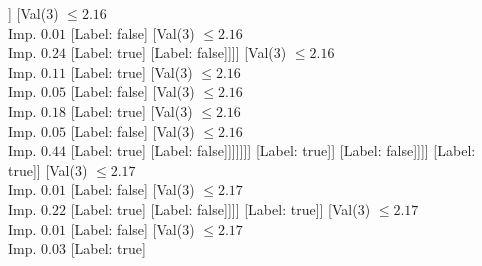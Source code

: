 \documentclass[margin=10pt]{standalone}
\begin{document}
\begin{forest}
																										[Label: true]
																										[Val($3$) $ \leq 2.16$ \\ Imp. $0.01$
																											[Val($3$) $ \leq 2.16$ \\ Imp. $0.05$
																												[Val($3$) $ \leq 2.16$ \\ Imp. $0.01$
																													[Val($3$) $ \leq 2.16$ \\ Imp. $0.02$
																														[Val($3$) $ \leq 2.16$ \\ Imp. $0.44$
																															[Label: false]
																															[Label: true]]
																														[Val($3$) $ \leq 2.16$ \\ Imp. $0.01$
																															[Label: false]
																															[Val($3$) $ \leq 2.16$ \\ Imp. $0.24$
																																[Label: true]
																																[Label: false]]]]
																													[Val($3$) $ \leq 2.16$ \\ Imp. $0.11$
																														[Label: true]
																														[Val($3$) $ \leq 2.16$ \\ Imp. $0.05$
																															[Label: false]
																															[Val($3$) $ \leq 2.16$ \\ Imp. $0.18$
																																[Label: true]
																																[Val($3$) $ \leq 2.16$ \\ Imp. $0.05$
																																	[Label: false]
																																	[Val($3$) $ \leq 2.16$ \\ Imp. $0.44$
																																		[Label: true]
																																		[Label: false]]]]]]]
																												[Label: true]]
																											[Label: false]]]]
																								[Label: true]]
																							[Val($3$) $ \leq 2.17$ \\ Imp. $0.01$
																								[Label: false]
																								[Val($3$) $ \leq 2.17$ \\ Imp. $0.22$
																									[Label: true]
																									[Label: false]]]]
																						[Label: true]]
																					[Val($3$) $ \leq 2.17$ \\ Imp. $0.01$
																						[Label: false]
																						[Val($3$) $ \leq 2.17$ \\ Imp. $0.03$
																							[Label: true]

\end{forest}
\end{document}
